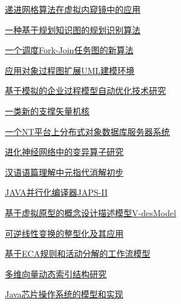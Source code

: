 \documentclass[a4paper]{article}
\begin{document}
\href{http://www.jos.org.cn/ch/reader/download_pdf.aspx?file_no=20020430&year_id=2002&quarter_id=4&falg=1}{递进网格算法在虚拟内窥镜中的应用}

\href{http://www.jos.org.cn/ch/reader/download_pdf.aspx?file_no=20020431&year_id=2002&quarter_id=4&falg=1}{一种基于规划知识图的规划识别算法}

\href{http://www.jos.org.cn/ch/reader/download_pdf.aspx?file_no=20020432&year_id=2002&quarter_id=4&falg=1}{一个调度Fork-Join任务图的新算法}

\href{http://www.jos.org.cn/ch/reader/download_pdf.aspx?file_no=20020433&year_id=2002&quarter_id=4&falg=1}{应用对象过程图扩展UML建模环境}

\href{http://www.jos.org.cn/ch/reader/download_pdf.aspx?file_no=20020434&year_id=2002&quarter_id=4&falg=1}{基于模拟的企业过程模型自动优化技术研究}

\href{http://www.jos.org.cn/ch/reader/download_pdf.aspx?file_no=20020435&year_id=2002&quarter_id=4&falg=1}{一类新的支撑矢量机核}

\href{http://www.jos.org.cn/ch/reader/download_pdf.aspx?file_no=20020436&year_id=2002&quarter_id=4&falg=1}{一个NT平台上分布式对象数据库服务器系统}

\href{http://www.jos.org.cn/ch/reader/download_pdf.aspx?file_no=20020437&year_id=2002&quarter_id=4&falg=1}{进化神经网络中的变异算子研究}

\href{http://www.jos.org.cn/ch/reader/download_pdf.aspx?file_no=20020438&year_id=2002&quarter_id=4&falg=1}{汉语语篇理解中元指代消解初步}

\href{http://www.jos.org.cn/ch/reader/download_pdf.aspx?file_no=20020439&year_id=2002&quarter_id=4&falg=1}{JAVA并行化编译器JAPS-II}

\href{http://www.jos.org.cn/ch/reader/download_pdf.aspx?file_no=20020440&year_id=2002&quarter_id=4&falg=1}{基于虚拟原型的概念设计描述模型V-desModel}

\href{http://www.jos.org.cn/ch/reader/download_pdf.aspx?file_no=20020441&year_id=2002&quarter_id=4&falg=1}{可逆线性变换的整型化及其应用}

\href{http://www.jos.org.cn/ch/reader/download_pdf.aspx?file_no=20020442&year_id=2002&quarter_id=4&falg=1}{基于ECA规则和活动分解的工作流模型}

\href{http://www.jos.org.cn/ch/reader/download_pdf.aspx?file_no=20020443&year_id=2002&quarter_id=4&falg=1}{多维向量动态索引结构研究}

\href{http://www.jos.org.cn/ch/reader/download_pdf.aspx?file_no=20020444&year_id=2002&quarter_id=4&falg=1}{Java芯片操作系统的模型和实现}
\end{document}
